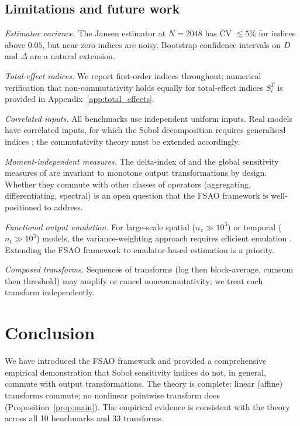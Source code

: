 \documentclass[11pt,onecolumn]{article}
\begin{document}
\subsection{Limitations and future work}
\label{sec:limitations}

\textit{Estimator variance.} The Jansen estimator at $N = 2048$ has CV $\lesssim 5\%$
for indices above $0.05$, but near-zero indices are noisy. Bootstrap confidence
intervals on $D$ and $\Delta$ are a natural extension.

\textit{Total-effect indices.} We report first-order indices throughout; numerical
verification that non-commutativity holds equally for total-effect indices
$S_i^T$ is provided in Appendix~\ref{app:total_effects}.

\textit{Correlated inputs.} All benchmarks use independent uniform inputs.
Real models have correlated inputs, for which the Sobol decomposition requires
generalised indices \citep{Oakley2004,Borgonovo2007}; the commutativity theory
must be extended accordingly.

\textit{Moment-independent measures.} The delta-index of \citet{Borgonovo2007}
and the global sensitivity measures of \citet{PlischkeBorgonovo2013} are
invariant to monotone output transformations by design. Whether they commute with
other classes of operators (aggregating, differentiating, spectral) is an open
question that the FSAO framework is well-positioned to address.

\textit{Functional output emulation.} For large-scale spatial ($n_z \gg 10^3$)
or temporal ($n_t \gg 10^3$) models, the variance-weighting approach requires
efficient emulation \citep{Sudret2008,Buzzard2012}.
Extending the FSAO framework to emulator-based estimation is a priority.

\textit{Composed transforms.} Sequences of transforms (log then block-average,
cumsum then threshold) may amplify or cancel noncommutativity; we treat each
transform independently.

\section{Conclusion}
\label{sec:conclusion}

We have introduced the FSAO framework and provided a comprehensive empirical
demonstration that Sobol sensitivity indices do not, in general, commute with
output transformations. The theory is complete: linear (affine) transforms
commute; no nonlinear pointwise transform does (Proposition~\ref{prop:main}).
The empirical evidence is consistent with the theory across all 10 benchmarks
and 33 transforms.
\end{document}
